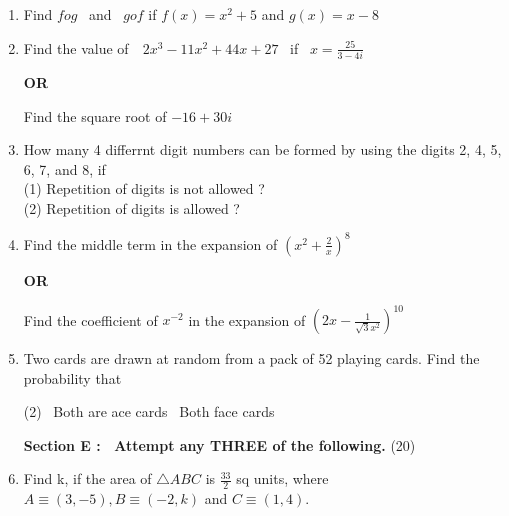 \documentclass[16pt,a4paper]{article}
\begin{document}
\begin {enumerate}
\begin{center}
\textbf {OR}
\end{center}

Find $P^2$ if \
\( P = \left[ 
\begin{array}{ccc} 
2&3&3 \\ 3&2&3 \\ 3&3&2
\end{array} 
\right] \)

\item Find $fog$ \ and \ $gof$ if $f(x) = x^2 + 5$ and $g(x) = x - 8 $

\item Find the value of\ \ $2x^3 - 11x^2 + 44x + 27$ \ if \ $x = \frac {25}{3 - 4i}$

\begin{center}
\textbf {OR}
\end{center}

Find the square root of $-16 + 30i$

\item How many 4 differrnt digit numbers can be formed by using the digits 2, 4, 5, 6, 7, and 8, if \\
(1) Repetition of digits is not allowed ?\\
(2) Repetition of digits is allowed ?

\item Find the middle term in the expansion of $\left(x^2 + \frac {2}{x} \right)^8$

\begin{center}
\textbf {OR}
\end{center}

Find the coefficient of $x^{-2}$ in the expansion of $\left(2x - \frac {1}{\sqrt 3 x^2} \right)^{10}$

\item Two cards are drawn at random from a pack of 52 playing cards. Find the probability that  
\begin{tasks}(2)
\task\ Both are ace cards
\task\ Both face cards
\end{tasks}


\begin{center}
\hfill \textbf{Section E : \ Attempt any \textbf {THREE} of the following.} \tabto{16.9cm}(20)
\end{center}

\item Find k, if the area of $\triangle ABC$ is $\frac {33}{2}$ sq units, where $A\equiv (3,-5), B\equiv (-2,k)$ and $C\equiv (1,4)$. 


\end{enumerate}
\end{document}
